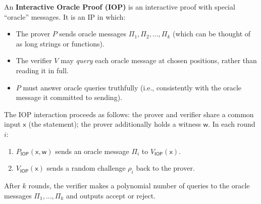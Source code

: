 \documentclass[11pt]{article}
\theoremstyle{plain}
\theoremstyle{definition}
\newcommand{\IOP}{\mathsf{IOP}}
\begin{document}
\begin{defbox}
An \textbf{Interactive Oracle Proof (IOP)} is an interactive proof with special
``oracle'' messages. It is an IP in which:
\begin{itemize}
  \item The prover $P$ sends oracle messages $\Pi_1, \Pi_2, \ldots, \Pi_k$
    (which can be thought of as long strings or functions).
  \item The verifier $V$ may \emph{query} each oracle message at chosen
    positions, rather than reading it in full.
  \item $P$ must answer oracle queries truthfully (i.e., consistently with the
    oracle message it committed to sending).
\end{itemize}
\end{defbox}

The IOP interaction proceeds as follows: the prover and verifier share a common
input $\mathsf{x}$ (the statement); the prover additionally holds a witness
$\mathsf{w}$. In each round $i$:
\begin{enumerate}
  \item $P_{\IOP}(\mathsf{x}, \mathsf{w})$ sends an oracle message $\Pi_i$
    to $V_{\IOP}(\mathsf{x})$.
  \item $V_{\IOP}(\mathsf{x})$ sends a random challenge $\rho_i$ back to the
    prover.
\end{enumerate}
After $k$ rounds, the verifier makes a polynomial number of queries to the
oracle messages $\Pi_1, \ldots, \Pi_k$ and outputs accept or reject.
\end{document}
